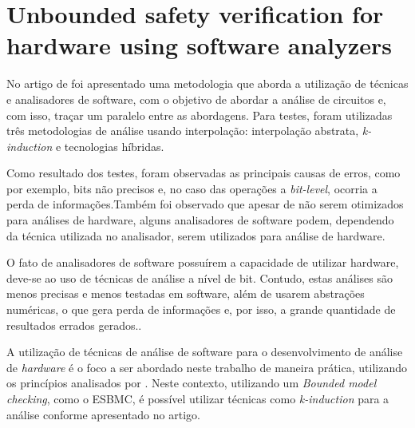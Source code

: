 \section{Unbounded safety verification for hardware using software analyzers}
No artigo de \citeauthor{mukherjee2016unbounded} foi apresentado uma metodologia que aborda a utilização de técnicas e analisadores de software, com o objetivo de abordar a análise de circuitos e, com isso, traçar um paralelo entre as abordagens. Para testes, foram utilizadas três metodologias de análise usando interpolação:\cite{beyer2011cpachecker} interpolação abstrata\cite{blanchet2003static}, \textit{k-induction}\cite{donaldson2011software} e tecnologias híbridas. 

\par
Como resultado dos testes, foram observadas as principais causas de erros, como por exemplo, bits não precisos e, no caso das operações a \textit{bit-level}, ocorria a perda de informações.Também foi observado que apesar de não serem otimizados para análises de hardware, alguns analisadores de software podem, dependendo da técnica utilizada no analisador, serem utilizados para análise de hardware\cite{mukherjee2016unbounded}.

\par
O fato de analisadores de software possuírem a capacidade de utilizar hardware, deve-se ao uso de técnicas de análise a nível de bit. Contudo, estas análises são menos precisas e menos testadas em software, além de usarem abstrações numéricas, o que gera perda de informações e, por isso, a grande quantidade de resultados errados gerados.\cite{mukherjee2016unbounded}.

\par
A utilização de técnicas de análise de software para o desenvolvimento de análise de \textit{hardware} é o foco a ser abordado neste trabalho de maneira prática, utilizando os princípios analisados por \cite{mukherjee2016unbounded}. Neste contexto, utilizando um \textit{Bounded model checking}, como o ESBMC, é possível utilizar técnicas como \textit{k-induction} para a análise conforme apresentado no artigo.

